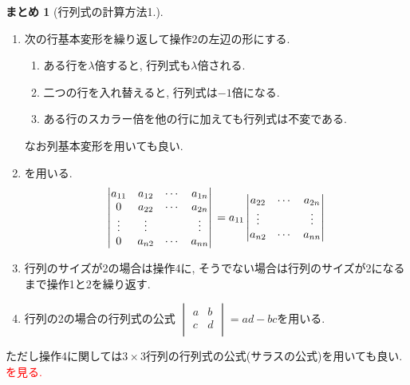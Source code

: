 \documentclass[dvipdfmx,a4paper,11pt]{article} %
\newcommand{\xr}[1]{\textcolor{red}{#1}}
\theoremstyle{definition}
\newtheorem{suma}[thm]{まとめ}
\begin{document}
 \begin{tcolorbox}[mybox]
    \begin{suma}[行列式の計算方法1.]
    \text{}
    
\begin{enumerate}[label=\textbf{操作}\arabic*.]
 \item  次の行基本変形を繰り返して操作2の左辺の形にする. 
\begin{enumerate}
\item[(I)] ある行を$\lambda$倍すると, 行列式も$\lambda$倍される.
 \item[(II)] 二つの行を入れ替えると, 行列式は$-1$倍になる. 
 \item[(III)] ある行のスカラー倍を他の行に加えても行列式は不変である. 
\end{enumerate}
 なお列基本変形を用いても良い.
 \item \cite[定理 3.3.2]{O}を用いる.
 $$
\begin{vmatrix}
a_{11} & a_{12} & \cdots & a_{1n} \\
0 & a_{22} & \cdots & a_{2n} \\
\vdots & \vdots & & \vdots \\
0& a_{n2} & \cdots & a_{nn}
\end{vmatrix}\\
=
a_{11} 
\begin{vmatrix}
a_{22} & \cdots & a_{2n} \\
\vdots & & \vdots \\
a_{n2} & \cdots & a_{nn}
\end{vmatrix}
 $$
 \item 行列のサイズが2の場合は操作4に, そうでない場合は行列のサイズが2になるまで操作1と2を繰り返す. 
 \item 行列の2の場合の行列式の公式
 $\begin{vmatrix}
a& b\\
c&d\\
 \end{vmatrix} 
=ad-bc$を用いる. 
 \end{enumerate}
 \end{suma}
  \end{tcolorbox}
  ただし操作4に関しては$3 \times 3$行列の行列式の公式(サラスの公式)を用いても良い. 
 \xr{\cite[例 3.2.7, 3.2.10, 3.3.3]{O}を見る.}
\end{document}
